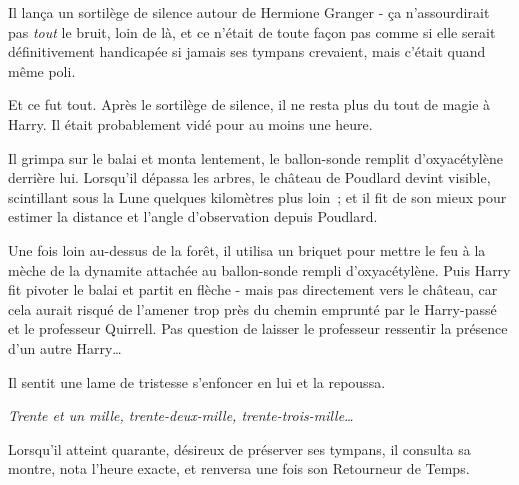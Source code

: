 Il lança un sortilège de silence autour de Hermione Granger - ça n'assourdirait pas \emph{tout} le bruit, loin de là, et ce n'était de toute façon pas comme si elle serait définitivement handicapée si jamais ses tympans crevaient, mais c'était quand même poli.

Et ce fut tout. Après le sortilège de silence, il ne resta plus du tout de magie à Harry. Il était probablement vidé pour au moins une heure.

Il grimpa sur le balai et monta lentement, le ballon-sonde remplit d'oxyacétylène derrière lui. Lorsqu'il dépassa les arbres, le château de Poudlard devint visible, scintillant sous la Lune quelques kilomètres plus loin~; et il fit de son mieux pour estimer la distance et l'angle d'observation depuis Poudlard.

Une fois loin au-dessus de la forêt, il utilisa un briquet pour mettre le feu à la mèche de la dynamite attachée au ballon-sonde rempli d'oxyacétylène. Puis Harry fit pivoter le balai et partit en flèche - mais pas directement vers le château, car cela aurait risqué de l'amener trop près du chemin emprunté par le Harry-passé et le professeur Quirrell. Pas question de laisser le professeur ressentir la présence d'un autre Harry…

Il sentit une lame de tristesse s'enfoncer en lui et la repoussa.

\emph{Trente et un mille, trente-deux-mille, trente-trois-mille…}

Lorsqu'il atteint quarante, désireux de préserver ses tympans, il consulta sa montre, nota l'heure exacte, et renversa une fois son Retourneur de Temps.
